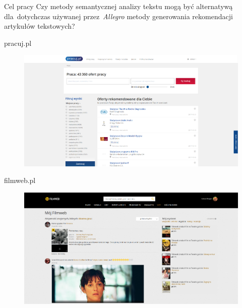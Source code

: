 \documentclass{beamer}
\begin{document}
	\begin{frame}{Cel pracy}
		Czy metody semantycznej analizy tekstu mogą być alternatywą dla~dotychczas używanej przez~\emph{Allegro} metody generowania rekomendacji artykułów tekstowych?

	\end{frame}
	\begin{frame}{pracuj.pl}
		\begin{figure}
			\centering
			\includegraphics[width=1\textwidth]{img/pracuj.png}
		\end{figure}
	\end{frame}
	\begin{frame}{filmweb.pl}
		\begin{figure}
			\centering
			\includegraphics[width=1\textwidth]{img/filmweb.png}
		\end{figure}
	\end{frame}
	
\end{document}
